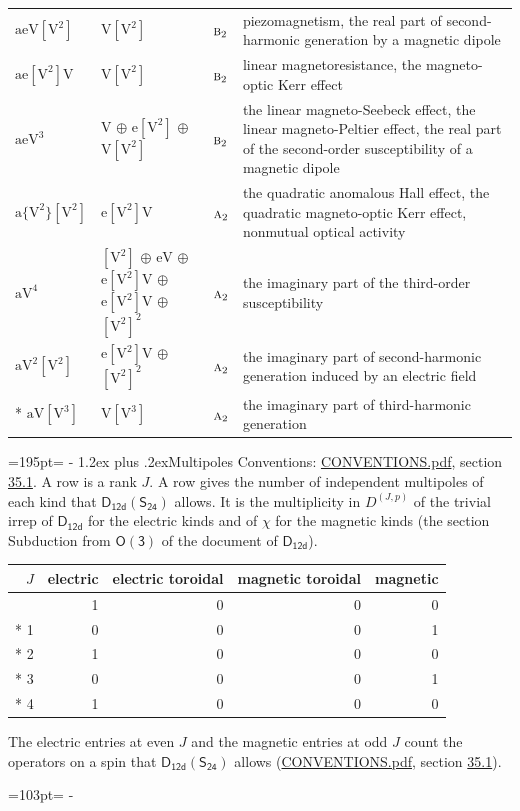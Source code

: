 \documentclass[10pt,a4paper]{article}
\makeatletter
\renewcommand\section{\@startsection{section}{1}{\z@}{-3ex plus -1ex minus -.2ex}%
  {1.2ex plus .2ex}{\normalfont\large\sffamily\bfseries\color{parttitle}}}
\newcommand{\needspace}[1]{\par\penalty-100\begingroup\dimen0=#1\relax\dimen2=\pagegoal
  \advance\dimen2-\pagetotal\ifdim\dimen0>\dimen2\relax\ifdim\dimen2>0pt\vfil\break\fi\fi
  \endgroup}
\numberwithin{equation}{section}
\newcommand{\grp}[1]{\mathsf{#1}}
\newcommand{\irr}[1]{\text{\normalfont\scshape #1}}
\newcommand{\irrJp}[2]{D^{(#1,#2)}}
\newcommand{\jahn}[1]{\mathrm{#1}}
\newlength{\fillwidth}\newlength{\cellwidth}\newlength{\colwidth}
\makeatother
\begin{document}
{\begin{longtable}{@{}lll>{\RaggedRight\arraybackslash}p{\fillwidth}@{}}
$\jahn{aeV[V^{2}]}$ & $\jahn{V[V^{2}]}$ & $\irr{b}_{2}$ & piezomagnetism, the real part of second-harmonic generation by a magnetic dipole\\
$\jahn{ae[V^{2}]V}$ & $\jahn{V[V^{2}]}$ & $\irr{b}_{2}$ & linear magnetoresistance, the magneto-optic Kerr effect\\
$\jahn{aeV^{3}}$ & $\jahn{V}$ $\oplus$ $\jahn{e[V^{2}]}$ $\oplus$ $\jahn{V[V^{2}]}$ & $\irr{b}_{2}$ & the linear magneto-Seebeck effect, the linear magneto-Peltier effect, the real part of the second-order susceptibility of a magnetic dipole\\
$\jahn{a\{V^{2}\}[V^{2}]}$ & $\jahn{e[V^{2}]V}$ & $\irr{a}_{2}$ & the quadratic anomalous Hall effect, the quadratic magneto-optic Kerr effect, nonmutual optical activity\\
$\jahn{aV^{4}}$ & $\jahn{[V^{2}]}$ $\oplus$ $\jahn{eV}$ $\oplus$ $\jahn{e[V^{2}]V}$ $\oplus$ $\jahn{e[V^{2}]V}$ $\oplus$ $\jahn{[V^{2}]^{2}}$ & $\irr{a}_{2}$ & the imaginary part of the third-order susceptibility\\
$\jahn{aV^{2}[V^{2}]}$ & $\jahn{e[V^{2}]V}$ $\oplus$ $\jahn{[V^{2}]^{2}}$ & $\irr{a}_{2}$ & the imaginary part of second-harmonic generation induced by an electric field\\*
$\jahn{aV[V^{3}]}$ & $\jahn{V[V^{3}]}$ & $\irr{a}_{2}$ & the imaginary part of third-harmonic generation\\
\bottomrule\end{longtable}}
\needspace{195pt}
\section{Multipoles}\label{s:multipoles}
Conventions: \href{../../CONVENTIONS.pdf}{CONVENTIONS.pdf}, section \href{../../CONVENTIONS.pdf\#conv.35.1}{35.1}.
A row is a rank $J$. \label{n:head.multipole.electric}\label{n:head.multipole.electric.toroidal}\label{n:head.multipole.magnetic.toroidal}\label{n:head.multipole.magnetic}A row gives the number of independent multipoles of each kind that $\grp{D_{12d}}(\grp{S_{24}})$ allows. It is the multiplicity in $\irrJp{J}{p}$ of the trivial irrep of $\grp{D_{12d}}$ for the electric kinds and of $\chi$ for the magnetic kinds (the section Subduction from $\grp{O(3)}$ of the document of \href{../../../rotation/data/pdf/D12d.pdf}{$\grp{D_{12d}}$}).
{\small\begin{longtable}{@{}rrrrr@{}}\toprule
$J$ & electric & electric toroidal & magnetic toroidal & magnetic\\\midrule\endhead
\bottomrule\endfoot\endlastfoot
0 & 1 & 0 & 0 & 0\\*
1 & 0 & 0 & 0 & 1\\*
2 & 1 & 0 & 0 & 0\\*
3 & 0 & 0 & 0 & 1\\*
4 & 1 & 0 & 0 & 0\\
\bottomrule\end{longtable}}
The electric entries at even $J$ and the magnetic entries at odd $J$ count the operators on a spin that $\grp{D_{12d}}(\grp{S_{24}})$ allows (\href{../../CONVENTIONS.pdf}{CONVENTIONS.pdf}, section \href{../../CONVENTIONS.pdf\#conv.35.1}{35.1}).
\needspace{103pt}
\end{document}
